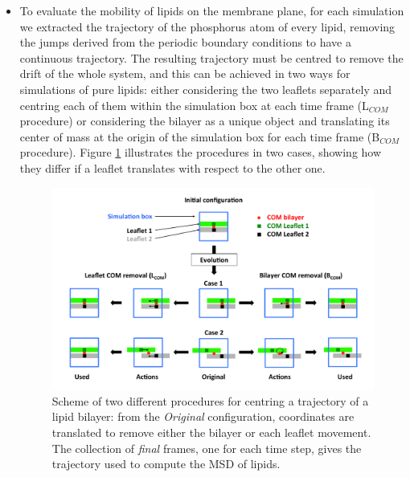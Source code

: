 \begin{itemize}
\item To evaluate the mobility of lipids on the membrane plane, for each simulation we extracted the trajectory of the phosphorus atom of every lipid, removing the jumps derived from the periodic boundary conditions to have a continuous trajectory. The resulting trajectory must be centred to remove the drift of the whole system, and this can be achieved in two ways for simulations of pure lipids: either considering the two leaflets separately and centring each of them within the simulation box at each time frame (L$_{COM}$ procedure) or considering the bilayer as a unique object and translating its center of mass at the origin of the simulation box for each time frame (B$_{COM}$ procedure). Figure \ref{fig:com_rem_scheme} illustrates the procedures in two cases, showing how they differ if a leaflet translates with respect to the other one.
%
\begin{figure}[t!]
\centering
\includegraphics[width=0.95\linewidth]{3results_capsule/pics/diff_comrem} 
\caption[Preparation of trajectories for diffusion coefficient computation]{Scheme of two different procedures for centring a trajectory of a lipid bilayer: from the \emph{Original} configuration, coordinates are translated to remove either the bilayer or each leaflet movement. The collection of \emph{final} frames, one for each time step, gives the trajectory used to compute the MSD of lipids.}
\label{fig:com_rem_scheme}
\end{figure}


\end{itemize}
